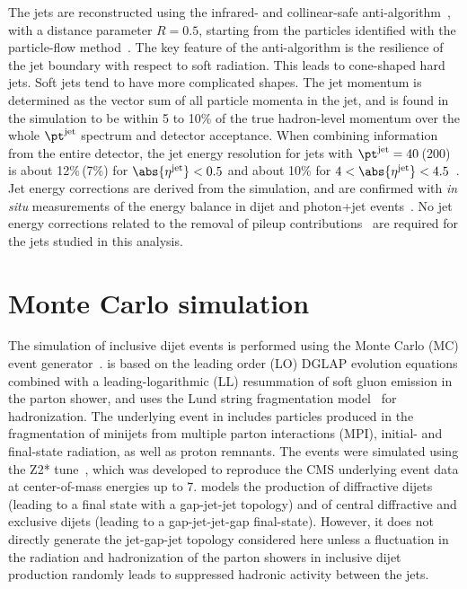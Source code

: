 \documentclass[11pt,twoside,a4paper,cmspaper,final,collab]{cms-tdr}
\begin{document}
{
The jets are reconstructed using the infrared- and collinear-safe anti-\kt algorithm~\cite{Cacciari:2008gp,Cacciari:2011ma}, with a distance parameter $R=0.5$, starting from the particles identified with the particle-flow method~\cite{PFnew}.
The key feature of the anti-\kt algorithm is the resilience of the jet boundary with respect to soft radiation. This leads to cone-shaped hard jets. Soft jets tend to have more complicated shapes.  The jet momentum is determined as the vector sum of all particle momenta in the jet, and is found in the simulation to be within 5 to 10\% of the true hadron-level momentum over the whole $\pt^{\text{jet}}$ spectrum and detector acceptance. When combining information from the entire detector, the jet energy resolution for jets with $\pt^{\text{jet}} =40$\GeV\,(200\GeV) is about 12\%\,(7\%) for $\abs{\eta^{\text{jet}}}<0.5$ and about 10\% for $4 < \abs{\eta^{\text{jet}}} < 4.5$~\cite{CMS-PAS-JME-10-003}. Jet energy corrections are derived from the simulation, and are confirmed with \textit{in situ} measurements of the energy balance in dijet and photon+jet events~\cite{CMS-PAS-JME-10-010}. No jet energy corrections related to the removal of pileup contributions~\cite{CMS-JME-10-011} are required for the jets studied in this analysis.
\par}

\section{Monte Carlo simulation}
\label{sec:mc}

The simulation of inclusive dijet events is performed using the  Monte Carlo (MC) event generator~\cite{pythia}.  is based on the leading order (LO) DGLAP evolution equations combined with a leading-logarithmic (LL) resummation of soft gluon emission in the parton shower, and uses the Lund string fragmentation model~\cite{Andersson:1983ia} for hadronization. The underlying event in  includes particles produced in the fragmentation of minijets from multiple parton interactions (MPI), initial- and final-state radiation, as well as proton remnants. The events were simulated using the Z2* tune~\cite{Chatrchyan:2013gfi}, which was developed to reproduce the CMS underlying event data at center-of-mass energies up to 7\TeV.  models the production of diffractive dijets (leading to a final state with a gap-jet-jet topology) and of central diffractive and exclusive dijets (leading to a gap-jet-jet-gap final-state). However, it does not directly generate the jet-gap-jet topology considered here unless a fluctuation in the radiation and hadronization of the parton showers in inclusive dijet production randomly leads to suppressed hadronic activity between the jets.
\end{document}
